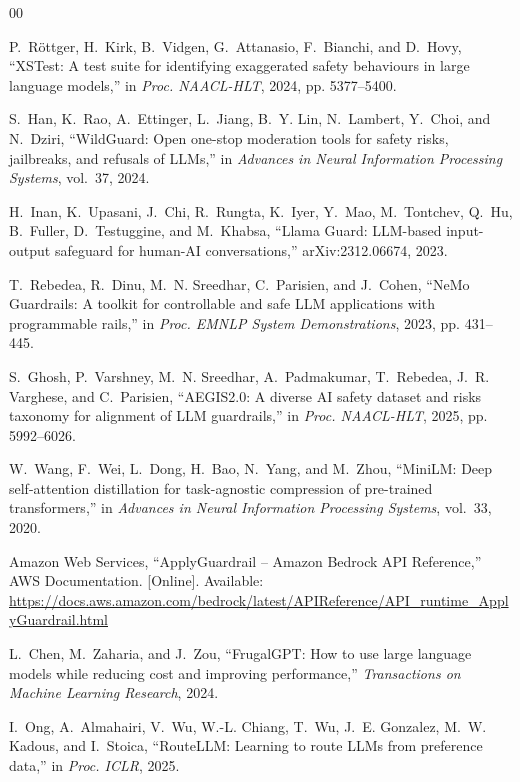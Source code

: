 \documentclass[conference]{IEEEtran}
\begin{document}
\begin{thebibliography}{00}

P.~R\"{o}ttger, H.~Kirk, B.~Vidgen, G.~Attanasio, F.~Bianchi, and D.~Hovy, ``XSTest: A test suite for identifying exaggerated safety behaviours in large language models,'' in \emph{Proc. NAACL-HLT}, 2024, pp. 5377--5400.

S.~Han, K.~Rao, A.~Ettinger, L.~Jiang, B.~Y. Lin, N.~Lambert, Y.~Choi, and N.~Dziri, ``WildGuard: Open one-stop moderation tools for safety risks, jailbreaks, and refusals of LLMs,'' in \emph{Advances in Neural Information Processing Systems}, vol.~37, 2024.

H.~Inan, K.~Upasani, J.~Chi, R.~Rungta, K.~Iyer, Y.~Mao, M.~Tontchev, Q.~Hu, B.~Fuller, D.~Testuggine, and M.~Khabsa, ``Llama Guard: LLM-based input-output safeguard for human-AI conversations,'' arXiv:2312.06674, 2023.

T.~Rebedea, R.~Dinu, M.~N. Sreedhar, C.~Parisien, and J.~Cohen, ``NeMo Guardrails: A toolkit for controllable and safe LLM applications with programmable rails,'' in \emph{Proc. EMNLP System Demonstrations}, 2023, pp. 431--445.

S.~Ghosh, P.~Varshney, M.~N. Sreedhar, A.~Padmakumar, T.~Rebedea, J.~R. Varghese, and C.~Parisien, ``AEGIS2.0: A diverse AI safety dataset and risks taxonomy for alignment of LLM guardrails,'' in \emph{Proc. NAACL-HLT}, 2025, pp. 5992--6026.

W.~Wang, F.~Wei, L.~Dong, H.~Bao, N.~Yang, and M.~Zhou, ``MiniLM: Deep self-attention distillation for task-agnostic compression of pre-trained transformers,'' in \emph{Advances in Neural Information Processing Systems}, vol.~33, 2020.

Amazon Web Services, ``ApplyGuardrail -- Amazon Bedrock API Reference,'' AWS Documentation. [Online]. Available: \url{https://docs.aws.amazon.com/bedrock/latest/APIReference/API_runtime_ApplyGuardrail.html}

L.~Chen, M.~Zaharia, and J.~Zou, ``FrugalGPT: How to use large language models while reducing cost and improving performance,'' \emph{Transactions on Machine Learning Research}, 2024.

I.~Ong, A.~Almahairi, V.~Wu, W.-L. Chiang, T.~Wu, J.~E. Gonzalez, M.~W. Kadous, and I.~Stoica, ``RouteLLM: Learning to route LLMs from preference data,'' in \emph{Proc. ICLR}, 2025.


\end{thebibliography}
\end{document}
